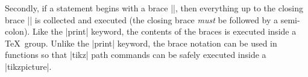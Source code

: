 Secondly, if a statement begins with  a brace |{|, then everything up to the
closing brace |}| is collected and executed (the closing brace \emph{must} be
followed by a semi-colon). Like the |print| keyword, the contents of the braces
is executed inside a \TeX\ group. Unlike the |print| keyword, the brace
notation can be used in functions so that |tikz| path commands can be safely
executed inside a |tikzpicture|.
%
\begin{codeexample}[preamble={\usetikzlibrary{math,calc}}]
\end{codeexample}
